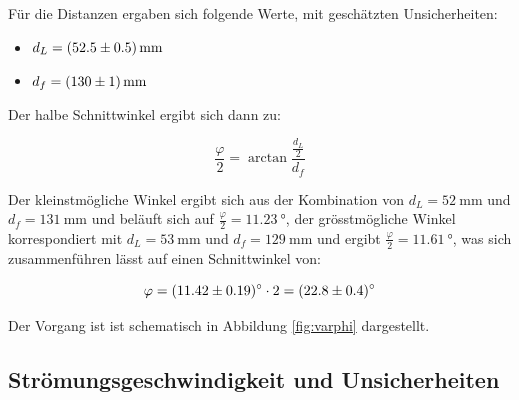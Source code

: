 F\"ur   die  Distanzen   ergaben  sich   folgende  Werte,   mit  gesch\"atzten
Unsicherheiten:

\begin{itemize}
    \item
        $ d_L = \SI{52.5 \pm 0.5}{\milli\meter}$
    \item
        $ d_f = \SI{130 \pm 1}{\milli\meter}$
\end{itemize}

Der halbe Schnittwinkel ergibt sich dann zu:

\begin{equation}
    \label{eq:varphi_half}
    \frac{\varphi}{2} = \arctan \frac{\frac{d_L}{2}}{d_f}
\end{equation}

Der kleinstm\"ogliche Winkel ergibt sich aus der Kombination von
$d_L = \SI{52}{\milli\meter}$
und
$d_f = \SI{131}{\milli\meter}$
und
bel\"auft sich auf
$\frac{\varphi}{2} = \SI{11.23}{\degree}$,
der gr\"osstm\"ogliche Winkel korrespondiert mit
$d_L = \SI{53}{\milli\meter}$
und
$d_f = \SI{129}{\milli\meter}$
und ergibt
$\frac{\varphi}{2} = \SI{11.61}{\degree}$,
was sich zusammenf\"uhren l\"asst auf einen Schnittwinkel von:

\begin{equation}
    \label{eq:varphi_result}
    \varphi = \SI{11.42 \pm 0.19}{\degree} \cdot 2 = \SI{22.8 \pm 0.4}{\degree}
\end{equation}

Der Vorgang ist ist schematisch in Abbildung \ref{fig:varphi} dargestellt.

\begin{minipage}[t]{\textwidth}
    \centering
    \resizebox{.67\textwidth}{!}{}
    \label{fig:varphi}
\end{minipage}



\clearpage
\subsection{Str\"omungsgeschwindigkeit und Unsicherheiten}
\label{subsec:vUncert}


